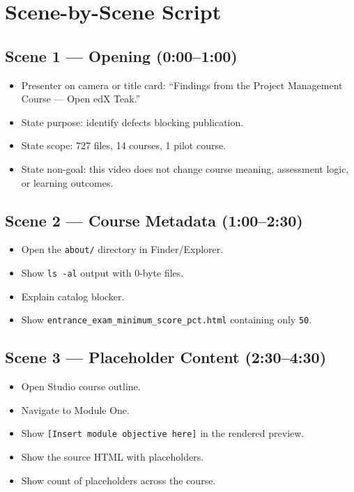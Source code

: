 \section{Scene-by-Scene Script}

\subsection*{Scene 1 — Opening (0:00--1:00)}
\begin{itemize}
  \item Presenter on camera or title card: ``Findings from the Project Management Course — Open edX Teak.''
  \item State purpose: identify defects blocking publication.
  \item State scope: 727 files, 14 courses, 1 pilot course.
  \item State non-goal: this video does not change course meaning, assessment logic, or learning outcomes.
\end{itemize}

\subsection*{Scene 2 — Course Metadata (1:00--2:30)}
\begin{itemize}
  \item Open the \texttt{about/} directory in Finder/Explorer.
  \item Show \texttt{ls -al} output with 0-byte files.
  \item Explain catalog blocker.
  \item Show \texttt{entrance\_exam\_minimum\_score\_pct.html} containing only \texttt{50}.
\end{itemize}

\subsection*{Scene 3 — Placeholder Content (2:30--4:30)}
\begin{itemize}
  \item Open Studio course outline.
  \item Navigate to Module One.
  \item Show \texttt{[Insert module objective here]} in the rendered preview.
  \item Show the source HTML with placeholders.
  \item Show count of placeholders across the course.
\end{itemize}

